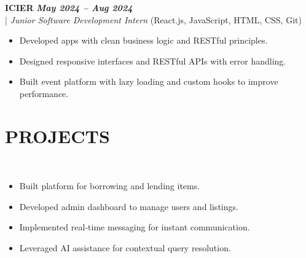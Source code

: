 \documentclass[10pt,a4paper]{article}
\begin{document}
\vspace{5pt}
\noindent
   \textbf{ICIER} \hfill \textit{\textbf{May 2024 -- Aug 2024}} \\
  \;|\;
  \textit{Junior Software Development Intern} (React.js, JavaScript, HTML, CSS, Git)
  \hfill

\begin{itemize}



\item Developed apps with clean business logic and RESTful principles.



\item Designed responsive interfaces and RESTful APIs with error handling.



\item Built event platform with lazy loading and custom hooks to improve performance.



\end{itemize}
\section*{PROJECTS}
\small

\noindent
{}\\[-12pt]
\begin{itemize}

\item Built platform for borrowing and lending items.

\item Developed admin dashboard to manage users and listings.

\item Implemented real-time messaging for instant communication.

\item Leveraged AI assistance for contextual query resolution.

\end{itemize}

\noindent
{}\\[-12pt]
\end{document}

